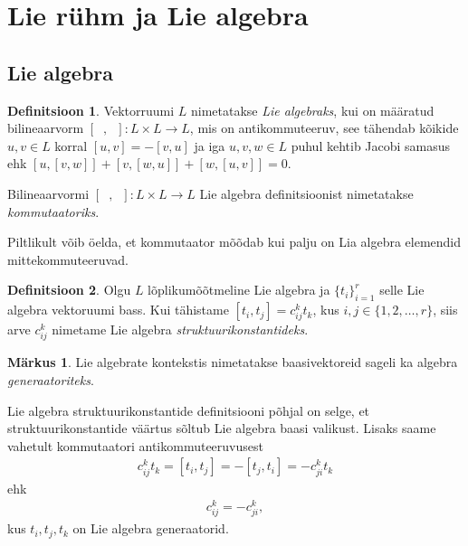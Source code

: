 \documentclass[a4paper,12pt]{article}
\theoremstyle{plain}
\theoremstyle{definition}
\newtheorem{definitsioon}{Definitsioon}[section]
\newtheorem{markus}{Märkus}[section]
\numberwithin{equation}{section}
\begin{document}
\newpage
\section{Lie rühm ja Lie algebra}

\subsection{Lie algebra}

\begin{definitsioon} \label{def:lie-algebra}
Vektorruumi $L$ nimetatakse \emph{Lie algebraks}, kui on määratud bilineaarvorm $\left[\phantom{u},\phantom{u}\right] : L \times L \rightarrow L$, mis on antikommuteeruv, see tähendab kõikide $u, v \in L$ korral $\left[u, v\right] = - \left[v, u\right]$ ja iga $u, v, w \in L$ puhul kehtib Jacobi samasus ehk $\left[u, \left[v, w\right]\right] + \left[v, \left[w, u\right]\right] + \left[w, \left[u, v\right]\right] = 0$.
\end{definitsioon}

Bilineaarvormi $\left[\phantom{u}, \phantom{u}\right] : L \times L \rightarrow L$ Lie algebra definitsioonist nimetatakse \emph{kommutaatoriks}.

Piltlikult võib öelda, et kommutaator mõõdab kui palju on Lia algebra elemendid mittekommuteeruvad.

\begin{definitsioon}
Olgu $L$ lõplikumõõtmeline Lie algebra ja $\{t_i\}_{i = 1}^{r}$ selle Lie algebra vektoruumi bass. Kui tähistame $\left[t_i, t_j\right] = c_{ij}^{k} t_{k}$, kus $i,j \in \{1, 2, \ldots, r\}$, siis arve $c_{ij}^{k}$ nimetame Lie algebra \emph{struktuurikonstantideks}.
\end{definitsioon}

\begin{markus}
Lie algebrate kontekstis nimetatakse baasivektoreid sageli ka algebra \emph{generaatoriteks}.
\end{markus}

Lie algebra struktuurikonstantide definitsiooni põhjal on selge, et struktuurikonstantide väärtus sõltub Lie algebra baasi valikust. Lisaks saame vahetult kommutaatori antikommuteeruvusest
\begin{align*}
c_{ij}^{k} t_k = \left[t_i, t_j\right] = - \left[t_j, t_i\right] = - c_{ji}^{k} t_k
\end{align*}
ehk
\begin{align} \label{eq:struktuurikonst-antikomm}
c_{ij}^{k} = -c_{ji}^{k},
\end{align}
kus $t_i, t_j, t_k$ on Lie algebra generaatorid.
\end{document}
